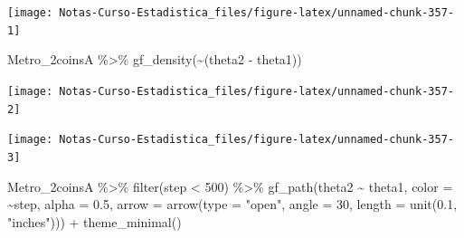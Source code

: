 \documentclass[
  12pt,
]{book}
\newenvironment{Shaded}{\begin{snugshade}}{\end{snugshade}}
\newcommand{\AttributeTok}[1]{\textcolor[rgb]{0.77,0.63,0.00}{#1}}
\newcommand{\DecValTok}[1]{\textcolor[rgb]{0.00,0.00,0.81}{#1}}
\newcommand{\FloatTok}[1]{\textcolor[rgb]{0.00,0.00,0.81}{#1}}
\newcommand{\FunctionTok}[1]{\textcolor[rgb]{0.00,0.00,0.00}{#1}}
\newcommand{\NormalTok}[1]{#1}
\newcommand{\SpecialCharTok}[1]{\textcolor[rgb]{0.00,0.00,0.00}{#1}}
\newcommand{\StringTok}[1]{\textcolor[rgb]{0.31,0.60,0.02}{#1}}
\theoremstyle{definition}
\theoremstyle{definition}
\theoremstyle{definition}
\theoremstyle{definition}
\theoremstyle{remark}
\begin{document}
\begin{center}\texttt{[image: Notas-Curso-Estadistica\_files/figure-latex/unnamed-chunk-357-1]} \end{center}

\begin{Shaded}
\begin{Highlighting}[]
\NormalTok{Metro\_2coinsA }\SpecialCharTok{\%\textgreater{}\%}
    \FunctionTok{gf\_density}\NormalTok{(}\SpecialCharTok{\textasciitilde{}}\NormalTok{(theta2 }\SpecialCharTok{{-}}\NormalTok{ theta1))}
\end{Highlighting}
\end{Shaded}

\begin{center}\texttt{[image: Notas-Curso-Estadistica\_files/figure-latex/unnamed-chunk-357-2]} \end{center}

\begin{Shaded}
\end{Shaded}

\begin{center}\texttt{[image: Notas-Curso-Estadistica\_files/figure-latex/unnamed-chunk-357-3]} \end{center}

\begin{Shaded}
\begin{Highlighting}[]
\NormalTok{Metro\_2coinsA }\SpecialCharTok{\%\textgreater{}\%}
    \FunctionTok{filter}\NormalTok{(step }\SpecialCharTok{\textless{}} \DecValTok{500}\NormalTok{) }\SpecialCharTok{\%\textgreater{}\%}
    \FunctionTok{gf\_path}\NormalTok{(theta2 }\SpecialCharTok{\textasciitilde{}}\NormalTok{ theta1, }\AttributeTok{color =} \SpecialCharTok{\textasciitilde{}}\NormalTok{step, }\AttributeTok{alpha =} \FloatTok{0.5}\NormalTok{,}
        \AttributeTok{arrow =} \FunctionTok{arrow}\NormalTok{(}\AttributeTok{type =} \StringTok{"open"}\NormalTok{, }\AttributeTok{angle =} \DecValTok{30}\NormalTok{, }\AttributeTok{length =} \FunctionTok{unit}\NormalTok{(}\FloatTok{0.1}\NormalTok{,}
            \StringTok{"inches"}\NormalTok{))) }\SpecialCharTok{+} \FunctionTok{theme\_minimal}\NormalTok{()}
\end{Highlighting}
\end{Shaded}
\end{document}
